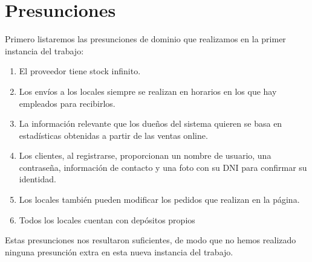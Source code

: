 \section{Presunciones}

Primero listaremos las presunciones de dominio que realizamos en la primer instancia del trabajo:
\begin{enumerate}
\item El proveedor tiene stock infinito.
\item Los envíos a los locales siempre se realizan en horarios en los que hay empleados para recibirlos.
\item La información relevante que los dueños del sistema quieren se basa en estadísticas obtenidas a partir de las ventas online.
\item Los clientes, al registrarse, proporcionan un nombre de usuario, una contraseña, información de contacto y una foto con su DNI para confirmar su identidad.
\item Los locales también pueden modificar los pedidos que realizan en la página.
\item Todos los locales cuentan con dep\'ositos propios
\end{enumerate}

Estas presunciones nos resultaron suficientes, de modo que no hemos realizado ninguna presunción extra en esta nueva instancia del trabajo.

\newpage